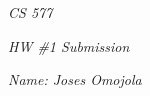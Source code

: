 \documentclass[12pt]{report}
\begin{document}
\centerline{\it CS 577}
\centerline{\it HW \#1 Submission}
\centerline{\it Name: Joses Omojola}





\end{document}
